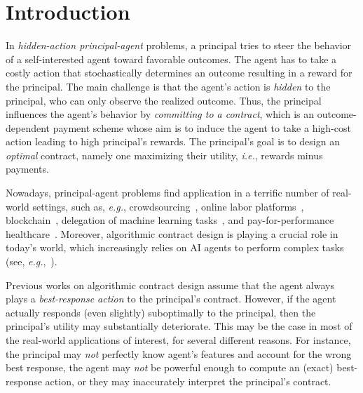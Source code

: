\section{Introduction}\label{sec:introduction}

In \emph{hidden-action principal-agent} problems, a principal tries to steer the behavior of a self-interested agent toward favorable outcomes.
%
The agent has to take a costly action that stochastically determines an outcome resulting in a reward for the principal.
%
The main challenge is that the agent's action is \emph{hidden} to the principal, who can only observe the realized outcome.
%
Thus, the principal influences the agent's behavior by \emph{committing to a contract},
%
which is an outcome-dependent payment scheme whose aim is to induce the agent to take a high-cost action leading to high principal's rewards.
%
The principal's goal is to design an \emph{optimal} contract, namely one maximizing their utility, \emph{i.e.}, rewards minus payments.


Nowadays, principal-agent problems find application in a terrific number of real-world settings, such as, \emph{e.g.}, crowdsourcing~\citep{ho2015adaptive}, online labor platforms~\citep{kaynar2023estimating}, blockchain~\citep{cong2019blockchain}, delegation of machine learning tasks~\citep{cai2015optimum}, and pay-for-performance healthcare~\citep{bastani2016analysis,bastani2019evidence}.
%
Moreover, algorithmic contract design is playing a crucial role in today's world, which increasingly relies on AI agents to perform complex tasks (see, \emph{e.g.},~\citep{hadfield2019incomplete,saig2024incentivizing}).


Previous works on algorithmic contract design assume that the agent always plays a \emph{best-response action} to the principal's contract.
%
However, if the agent actually responds (even slightly) suboptimally to the principal, then the principal's utility may substantially deteriorate.
%
This may be the case in most of the real-world applications of interest, for several different reasons.
%
For instance, the principal  may \emph{not} perfectly know agent's features and account for the wrong best response, the agent may \emph{not} be powerful enough to compute an (exact) best-response action, or they may inaccurately interpret the principal's contract. 


